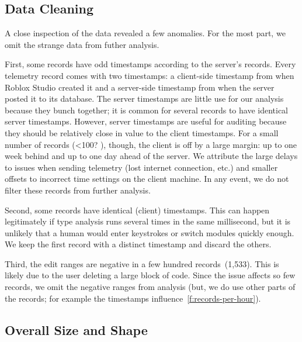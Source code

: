 \documentclass[english,submission,cleveref]{programming}
\begin{document}
\subsection{Data Cleaning}
\label{s:data-cleaning}

A close inspection of the data revealed a few anomalies.
For the most part, we omit the strange data from futher
analysis.

First, some records have odd timestamps according to the server's records.
Every telemetry record comes with two timestamps: a client-side timestamp
from when Roblox Studio created it and a server-side timestamp from when
the server posted it to its database.
The server timestamps are little use for our analysis because they bunch
together; it is common for several records to have identical server
timestamps.
However, server timestamps are useful for auditing because they should
be relatively close in value to the client timestamps.
For a small number of records (<100? \FILL{}), though, the client is off by a large
margin: up to one week behind and up to one day ahead of the server.
We attribute the large delays to issues when sending telemetry (lost internet
connection, etc.) and smaller offsets to incorrect time settings on the client
machine.
In any event, we do not filter these records from further
analysis.

Second, some records have identical (client) timestamps.
This can happen legitimately if type analysis runs several times
in the same millisecond, but it is unlikely that a human would
enter keystrokes or switch modules quickly enough.
We keep the first record with a distinct timestamp and discard the others.

Third, the edit ranges are negative in a few hundred records~(1,533).
This is likely due to the user deleting a large block of code.
Since the issue affects so few records, we omit the negative ranges
from analysis (but, we do use other parts of the records; for example
the timestamps influence~\cref{f:records-per-hour}).

\subsection{Overall Size and Shape}
\end{document}
